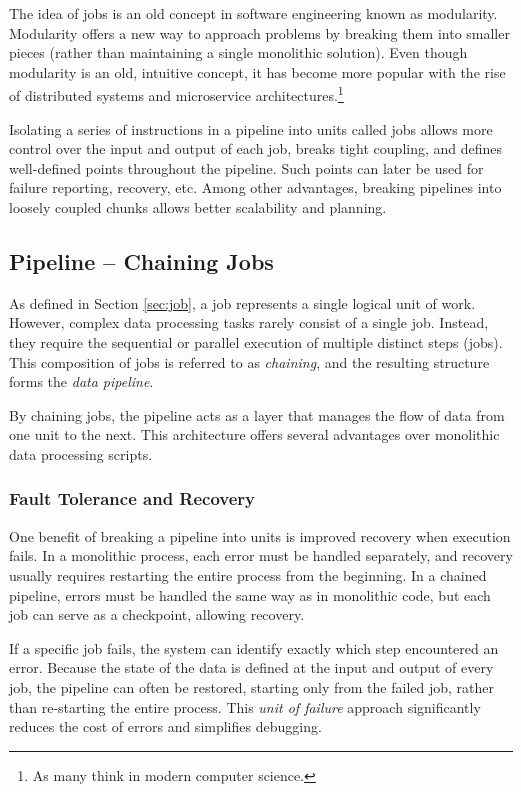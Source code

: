 The idea of jobs is an old concept in software engineering known as modularity. Modularity offers a new way to approach problems by breaking them into smaller pieces (rather than maintaining a single monolithic solution). Even though modularity is an old, intuitive concept, it has become more popular with the rise of distributed systems and microservice architectures.\cite{reis_fundamentals_2022}\footnote{As many think in modern computer science.}

Isolating a series of instructions in a pipeline into units called jobs allows more control over the input and output of each job, breaks tight coupling, and defines well-defined points throughout the pipeline. Such points can later be used for failure reporting, recovery, etc. Among other advantages, breaking pipelines into loosely coupled chunks allows better scalability and planning. \cite{reis_fundamentals_2022}

\subsection{Pipeline -- Chaining Jobs}
As defined in Section \ref{sec:job}, a job represents a single logical unit of work. However, complex data processing tasks rarely consist of a single job. Instead, they require the sequential or parallel execution of multiple distinct steps (jobs). This composition of jobs is referred to as \textit{chaining}, and the resulting structure forms the \textit{data pipeline}.

By chaining jobs, the pipeline acts as a layer that manages the flow of data from one unit to the next. This architecture offers several advantages over monolithic data processing scripts.

\subsubsection*{Fault Tolerance and Recovery}
One benefit of breaking a pipeline into units is improved recovery when execution fails. In a monolithic process, each error must be handled separately, and recovery usually requires restarting the entire process from the beginning. In a chained pipeline, errors must be handled the same way as in monolithic code, but each job can serve as a checkpoint, allowing recovery. 

If a specific job fails, the system can identify exactly which step encountered an error. Because the state of the data is defined at the input and output of every job, the pipeline can often be restored, starting only from the failed job, rather than re-starting the entire process. This \textit{unit of failure} approach significantly reduces the cost of errors and simplifies debugging.

